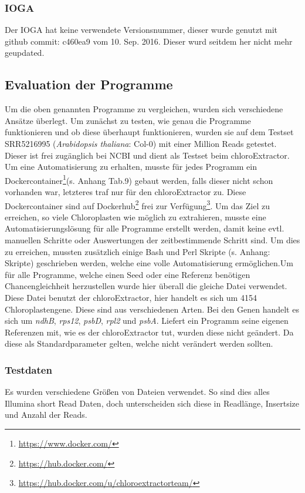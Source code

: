 \documentclass{scrartcl}
\begin{document}
\subsubsection{IOGA}
\label{sec-3-1-6}
Der IOGA hat keine verwendete Versionsnummer, dieser wurde genutzt mit github commit: c460ea9 vom 10. Sep. 2016. Dieser wurd seitdem her nicht mehr geupdated. 

\subsection{Evaluation der Programme}
\label{sec-3-2}
Um die oben genannten Programme zu vergleichen, wurden sich verschiedene Ansätze überlegt.
Um zunächst zu testen, wie genau die Programme funktionieren und ob diese überhaupt funktionieren,
wurden sie auf dem Testset SRR5216995 (\emph{Arabidopsis thaliana}: Col-0) mit einer Million Reads getestet. 
Dieser ist frei zugänglich bei NCBI\footnotemark[38]{} und dient als Testset beim chloroExtractor\footnotemark[16]{}. Um eine 
Automatisierung zu erhalten, musste für jedes Programm ein Dockercontainer\footnote{\url{https://www.docker.com/}}(s. Anhang Tab.9) gebaut werden, falls dieser nicht 
schon vorhanden war, letzteres traf nur für den chloroExtractor zu. Diese Dockercontainer sind auf Dockerhub\footnote{\url{https://hub.docker.com/}} frei
zur Verfügung\footnote{\url{https://hub.docker.com/u/chloroextractorteam/}}. Um das Ziel zu erreichen,
so viele Chloroplasten wie möglich zu extrahieren, musste eine Automatisierungslösung für alle Programme
erstellt werden, damit keine evtl. manuellen Schritte oder Auswertungen der zeitbestimmende Schritt sind.
Um dies zu erreichen, mussten zusätzlich einige Bash und Perl Skripte (s. Anhang: Skripte) geschrieben werden, welche eine volle
Automatisierung ermöglichen.Um für alle Programme, welche einen Seed oder eine Referenz benötigen Chancengleichheit herzustellen wurde hier überall die gleiche Datei verwendet. 
Diese Datei benutzt der chloroExtractor, hier handelt es sich um 4154 Chloroplastengene. Diese sind aus verschiedenen Arten. Bei den Genen handelt es sich um \emph{ndhB}, \emph{rps12}, \emph{psbD}, \emph{rpl2} und \emph{psbA}. 
Liefert ein Programm seine eigenen Referenzen mit, wie es der chloroExtractor tut, wurden diese nicht geändert. Da diese als Standardparameter gelten, welche nicht verändert werden sollten.   

\subsubsection{Testdaten}
\label{sec-3-2-1}
Es wurden verschiedene Größen von Dateien verwendet. So sind dies alles Illumina short Read Daten, doch unterscheiden sich diese in Readlänge, Insertsize und Anzahl der Reads.
\end{document}
